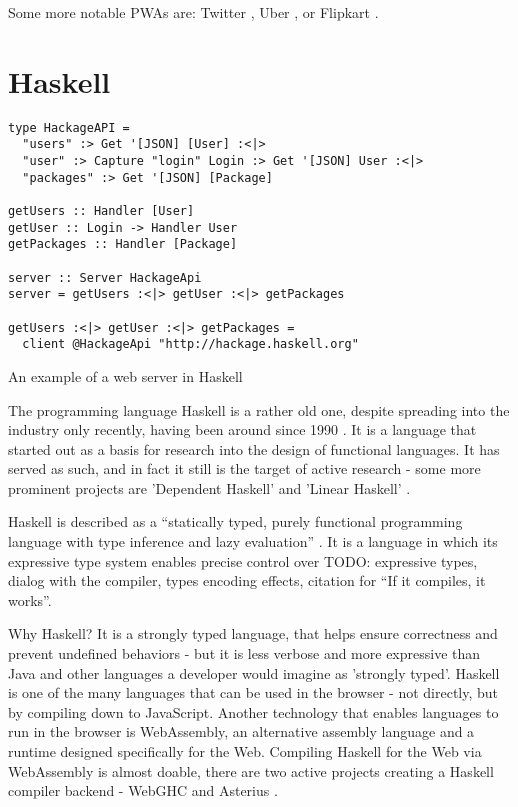 \documentclass[english,odsaz]{fitthesis}
\begin{document}
Some more notable PWAs are: Twitter \cite{twitter}, Uber \cite{uber}, or Flipkart
\cite{flipkart}.

\section{Haskell}
\label{sec:org64a45fb}
\begin{listing}[htbp]
\begin{verbatim}
type HackageAPI =
  "users" :> Get '[JSON] [User] :<|>
  "user" :> Capture "login" Login :> Get '[JSON] User :<|>
  "packages" :> Get '[JSON] [Package]

getUsers :: Handler [User]
getUser :: Login -> Handler User
getPackages :: Handler [Package]

server :: Server HackageApi
server = getUsers :<|> getUser :<|> getPackages

getUsers :<|> getUser :<|> getPackages =
  client @HackageApi "http://hackage.haskell.org"
\end{verbatim}
\caption{An example of a web server in Haskell}
\end{listing}

The programming language Haskell is a rather old one, despite spreading into the
industry only recently, having been around since 1990 \cite{haskell_history}. It
is a language that started out as a basis for research into the design of
functional languages. It has served as such, and in fact it still is the target
of active research - some more prominent projects are 'Dependent Haskell'
\cite{eisenberg2016dependent} and 'Linear Haskell' \cite{bernardy2017linear}.

Haskell is described as a ``statically typed, purely functional programming
language with type inference and lazy evaluation'' \cite{jones2003haskell}. It is a
language in which its expressive type system enables precise control over TODO:
expressive types, dialog with the compiler, types encoding effects, citation for
``If it compiles, it works''.

Why Haskell? It is a strongly typed language, that helps ensure correctness and
prevent undefined behaviors - but it is less verbose and more expressive than
Java and other languages a developer would imagine as 'strongly typed'. Haskell
is one of the many languages that can be used in the browser - not directly, but
by compiling down to JavaScript. Another technology that enables languages to
run in the browser is WebAssembly, an alternative assembly language and a
runtime designed specifically for the Web. Compiling Haskell for the Web via
WebAssembly is almost doable, there are two active projects creating a Haskell
compiler backend - WebGHC \cite{webghc} and Asterius \cite{asterius}.
\end{document}
